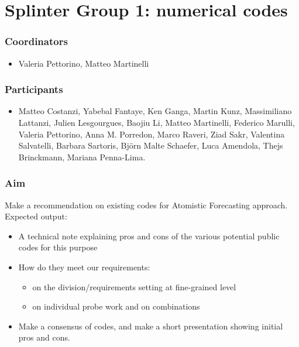 



%

\section{Splinter Group 1: numerical codes}

\subsubsection*{Coordinators}
\begin{itemize}
 \item Valeria Pettorino, Matteo Martinelli
\end{itemize}
\subsubsection*{Participants}
\begin{itemize}
 \item Matteo Costanzi,  Yabebal Fantaye, Ken Ganga, Martin Kunz, Massimiliano Lattanzi, Julien Lesgourgues, Baojiu Li, Matteo Martinelli, Federico Marulli, Valeria Pettorino, Anna M. Porredon, Marco Raveri, Ziad Sakr, Valentina Salvatelli, Barbara Sartoris, Bj\"orn Malte Schaefer, Luca Amendola, Thejs Brinckmann, Mariana Penna-Lima.
\end{itemize}

\subsubsection*{Aim}
Make a recommendation on existing codes for Atomistic Forecasting approach.\\
Expected output:
\begin{itemize}
 \item A technical note explaining pros and cons of the various potential public codes for this purpose 
 \item How do they meet our requirements:
 \begin{itemize}
  \item on the division/requirements setting at fine-grained level 
  \item on individual probe work and on combinations
 \end{itemize}
 \item Make a consensus of codes, and make a short presentation showing initial pros and cons.
\end{itemize}

